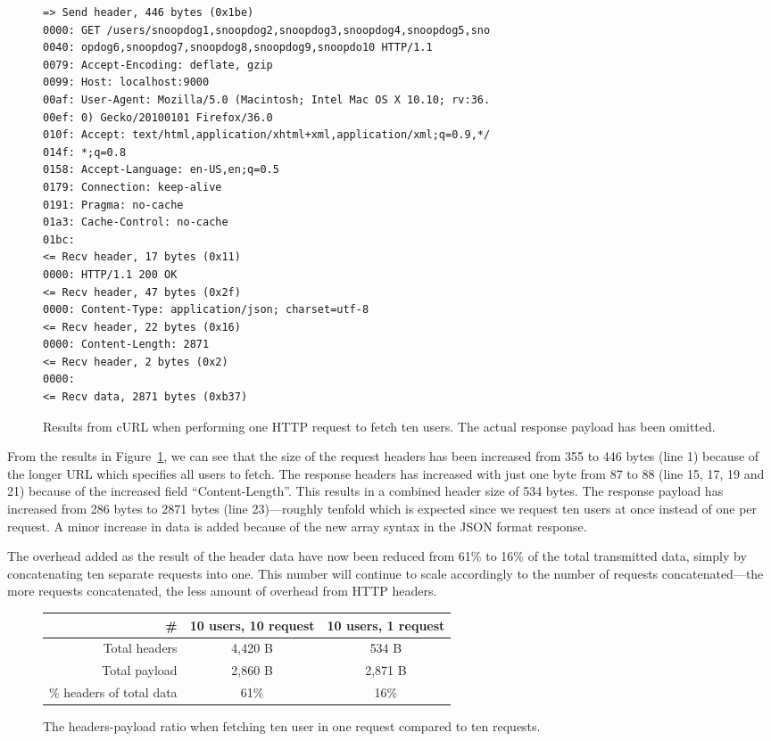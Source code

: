 \documentclass{cslthse-msc}
\begin{document}
\begin{figure}[H]
  \centering
\begin{lstlisting}[breaklines=true]
=> Send header, 446 bytes (0x1be)
0000: GET /users/snoopdog1,snoopdog2,snoopdog3,snoopdog4,snoopdog5,sno
0040: opdog6,snoopdog7,snoopdog8,snoopdog9,snoopdo10 HTTP/1.1
0079: Accept-Encoding: deflate, gzip
0099: Host: localhost:9000
00af: User-Agent: Mozilla/5.0 (Macintosh; Intel Mac OS X 10.10; rv:36.
00ef: 0) Gecko/20100101 Firefox/36.0
010f: Accept: text/html,application/xhtml+xml,application/xml;q=0.9,*/
014f: *;q=0.8
0158: Accept-Language: en-US,en;q=0.5
0179: Connection: keep-alive
0191: Pragma: no-cache
01a3: Cache-Control: no-cache
01bc:
<= Recv header, 17 bytes (0x11)
0000: HTTP/1.1 200 OK
<= Recv header, 47 bytes (0x2f)
0000: Content-Type: application/json; charset=utf-8
<= Recv header, 22 bytes (0x16)
0000: Content-Length: 2871
<= Recv header, 2 bytes (0x2)
0000:
<= Recv data, 2871 bytes (0xb37)
\end{lstlisting}
  \caption{Results from cURL when performing one HTTP request to fetch ten users. The actual response payload has been omitted.}
  \label{fig:headers_overhead2}
\end{figure}

From the results in Figure~\ref{fig:headers_overhead2}, we can see that the size of the request headers has been increased from 355 to 446 bytes (line 1) because of the longer URL which specifies all users to fetch. The response headers has increased with just one byte from 87 to 88 (line 15, 17, 19 and 21) because of the increased field \enquote{Content-Length}. This results in a combined header size of 534 bytes. The response payload has increased from 286 bytes to 2871 bytes (line 23)---roughly tenfold which is expected since we request ten users at once instead of one per request. A minor increase in data is added because of the new array syntax in the JSON format response.

The overhead added as the result of the header data have now been reduced from 61\% to 16\% of the total transmitted data, simply by concatenating ten separate requests into one. This number will continue to scale accordingly to the number of requests concatenated---the more requests concatenated, the less amount of overhead from HTTP headers.

\begin{figure}[H]
  \centering
    \begin{center}
      \begin{tabular}{ r | c | c }
        \textbf{\#} & \textbf{10 users, 10 request} & \textbf{10 users, 1 request} \\ \hline
        Total headers & 4,420 B & 534 B \\ \hline
        Total payload & 2,860 B & 2,871 B \\ \hline
        \% headers of total data & 61\% & 16\% \\ \hline
      \end{tabular}
    \end{center}
  \caption{The headers-payload ratio when fetching ten user in one request compared to ten requests.}
\end{figure}
\end{document}
